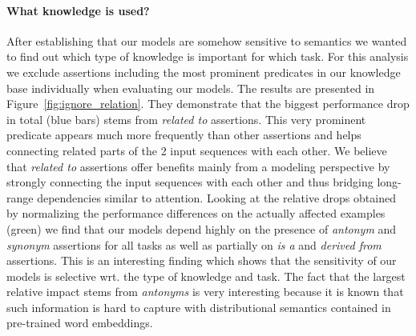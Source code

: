 \documentclass[11pt,a4paper]{article}
\begin{document}
\paragraph{What knowledge is used?} After establishing that our models are somehow sensitive to semantics we wanted to find out which type of knowledge is important for which task. For this analysis we exclude assertions including the most prominent predicates in our knowledge base individually when evaluating our models. The results are presented in Figure~\ref{fig:ignore_relation}. They demonstrate that the biggest performance drop in total (blue bars) stems from \textit{related to} assertions. This very prominent predicate appears much more frequently than other assertions and helps connecting related parts of the 2 input sequences with each other. We believe that \textit{related to} assertions offer benefits mainly from a modeling perspective by strongly connecting the input sequences with each other and thus bridging long-range dependencies similar to attention. Looking at the relative drops obtained by normalizing the performance differences on the actually affected examples (green) we find that our models depend highly on the presence of \textit{antonym} and \textit{synonym} assertions for all tasks as well as partially on \textit{is a} and \textit{derived from} assertions. This is an interesting finding which shows that the sensitivity of our models is selective wrt. the type of knowledge and task. The fact that the largest relative impact stems from \textit{antonyms} is very interesting because it is known that such information is hard to capture with distributional semantics contained in pre-trained word embeddings.
\end{document}
